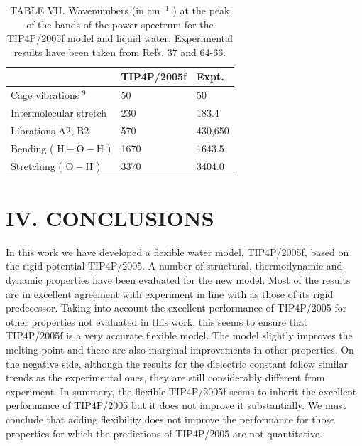 \documentclass[10pt]{article}
\begin{document}
\begin{table}[h]
\begin{center}
\captionsetup{labelformat=empty}
\caption{TABLE VII. Wavenumbers (in $\mathrm{cm}^{-1}$ ) at the peak of the bands of the power spectrum for the TIP4P/2005f model and liquid water. Experimental results have been taken from Refs. 37 and 64-66.}
\begin{tabular}{|l|l|l|}
\hline
 & TIP4P/2005f & Expt. \\
\hline
Cage vibrations ${ }^{9}$ & 50 & 50 \\
\hline
Intermolecular stretch & 230 & 183.4 \\
\hline
Librations A2, B2 & 570 & 430,650 \\
\hline
Bending ( $\mathrm{H}-\mathrm{O}-\mathrm{H}$ ) & 1670 & 1643.5 \\
\hline
Stretching ( $\mathrm{O}-\mathrm{H}$ ) & 3370 & 3404.0 \\
\hline
\end{tabular}
\end{center}
\end{table}

\section*{IV. CONCLUSIONS}
In this work we have developed a flexible water model, TIP4P/2005f, based on the rigid potential TIP4P/2005. A number of structural, thermodynamic and dynamic properties have been evaluated for the new model. Most of the results are in excellent agreement with experiment in line with as those of its rigid predecessor. Taking into account the excellent performance of TIP4P/2005 for other properties not evaluated in this work, this seems to ensure that TIP4P/2005f is a very accurate flexible model. The model slightly improves the melting point and there are also marginal improvements in other properties. On the negative side, although the results for the dielectric constant follow similar trends as the experimental ones, they are still considerably different from experiment. In summary, the flexible TIP4P/2005f seems to inherit the excellent performance of TIP4P/2005 but it does not improve it substantially. We must conclude that adding flexibility does not improve the performance for those properties for which the predictions of TIP4P/2005 are not quantitative.
\end{document}
